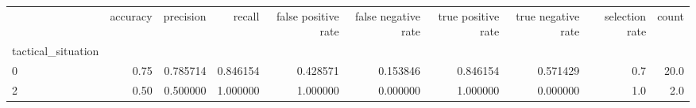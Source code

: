 \begin{tabular}{lrrrrrrrrr}
\toprule
{} &  accuracy &  precision &    recall &  false positive rate &  false negative rate &  true positive rate &  true negative rate &  selection rate &  count \\
tactical\_situation &           &            &           &                      &                      &                     &                     &                 &        \\
\midrule
0                  &      0.75 &   0.785714 &  0.846154 &             0.428571 &             0.153846 &            0.846154 &            0.571429 &             0.7 &   20.0 \\
2                  &      0.50 &   0.500000 &  1.000000 &             1.000000 &             0.000000 &            1.000000 &            0.000000 &             1.0 &    2.0 \\
\bottomrule
\end{tabular}
